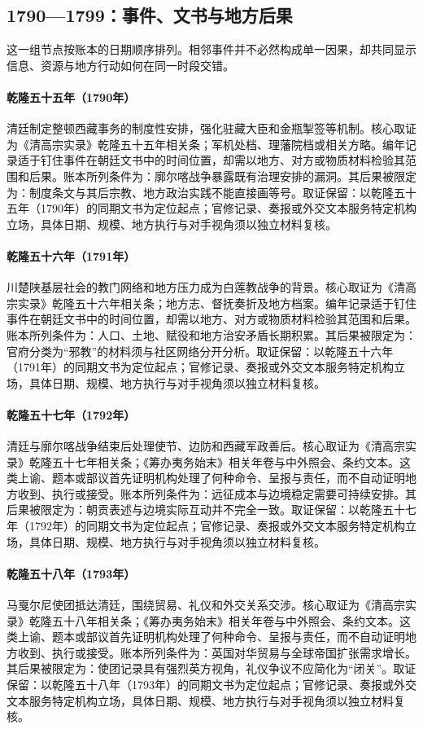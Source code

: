 \subsection{1790—1799：事件、文书与地方后果}
这一组节点按账本的日期顺序排列。相邻事件并不必然构成单一因果，却共同显示信息、资源与地方行动如何在同一时段交错。
\hypertarget{ledger:EQ-1790-IMPERIAL-REGULATIONS-TIBET}{}\paragraph{乾隆五十五年（1790年）}清廷制定整顿西藏事务的制度性安排，强化驻藏大臣和金瓶掣签等机制。核心取证为《清高宗实录》乾隆五十五年相关条；军机处档、理藩院档或相关方略。编年记录适于钉住事件在朝廷文书中的时间位置，却需以地方、对方或物质材料检验其范围和后果。账本所列条件为：廓尔喀战争暴露既有治理安排的漏洞。其后果被限定为：制度条文与其后宗教、地方政治实践不能直接画等号。取证保留：以乾隆五十五年（1790年）的同期文书为定位起点；官修记录、奏报或外交文本服务特定机构立场，具体日期、规模、地方执行与对手视角须以独立材料复核。
\hypertarget{ledger:EQ-1791-WHITE-LOTUS-PRECURSORS}{}\paragraph{乾隆五十六年（1791年）}川楚陕基层社会的教门网络和地方压力成为白莲教战争的背景。核心取证为《清高宗实录》乾隆五十六年相关条；地方志、督抚奏折及地方档案。编年记录适于钉住事件在朝廷文书中的时间位置，却需以地方、对方或物质材料检验其范围和后果。账本所列条件为：人口、土地、赋役和地方治安矛盾长期积累。其后果被限定为：官府分类为“邪教”的材料须与社区网络分开分析。取证保留：以乾隆五十六年（1791年）的同期文书为定位起点；官修记录、奏报或外交文本服务特定机构立场，具体日期、规模、地方执行与对手视角须以独立材料复核。
\hypertarget{ledger:EQ-1792-GURKHA-SETTLEMENT}{}\paragraph{乾隆五十七年（1792年）}清廷与廓尔喀战争结束后处理使节、边防和西藏军政善后。核心取证为《清高宗实录》乾隆五十七年相关条；《筹办夷务始末》相关年卷与中外照会、条约文本。这类上谕、题本或部议首先证明机构处理了何种命令、呈报与责任，而不自动证明地方收到、执行或接受。账本所列条件为：远征成本与边境稳定需要可持续安排。其后果被限定为：朝贡表述与边境实际互动并不完全一致。取证保留：以乾隆五十七年（1792年）的同期文书为定位起点；官修记录、奏报或外交文本服务特定机构立场，具体日期、规模、地方执行与对手视角须以独立材料复核。
\hypertarget{ledger:EQ-1793-MACARTNEY-MISSION}{}\paragraph{乾隆五十八年（1793年）}马戛尔尼使团抵达清廷，围绕贸易、礼仪和外交关系交涉。核心取证为《清高宗实录》乾隆五十八年相关条；《筹办夷务始末》相关年卷与中外照会、条约文本。这类上谕、题本或部议首先证明机构处理了何种命令、呈报与责任，而不自动证明地方收到、执行或接受。账本所列条件为：英国对华贸易与全球帝国扩张需求增长。其后果被限定为：使团记录具有强烈英方视角，礼仪争议不应简化为“闭关”。取证保留：以乾隆五十八年（1793年）的同期文书为定位起点；官修记录、奏报或外交文本服务特定机构立场，具体日期、规模、地方执行与对手视角须以独立材料复核。
